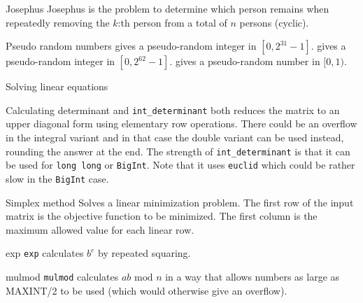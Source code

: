 \begin{algorithm}{Josephus}
\desc
Josephus is the problem to determine which person remains when repeatedly
removing the $k$:th person from a total of $n$ persons (cyclic).
\end{algorithm}


\begin{algorithm}{Pseudo random numbers}
 gives a pseudo-random integer in
$[0,2^{31}-1]$.
 gives a pseudo-random integer in
$[0,2^{62}-1]$.
 gives a pseudo-random number in
$[0,1)$.
\end{algorithm}

\begin{algorithm}{Solving linear equations}
\end{algorithm}

\begin{algorithm}{Calculating determinant}
 and {\tt int\_determinant} both reduces the matrix
to an upper diagonal form using elementary row operations. There could be an
overflow in the integral variant and in that case the double variant
can be used instead, rounding the answer at the end. The strength of
{\tt int\_determinant} is that it can be used for {\tt long long} or
{\tt BigInt}. Note that it uses {\tt euclid} which could be rather
slow in the {\tt BigInt} case.
\end{algorithm}

\begin{algorithm}{Simplex method}
\desc
Solves a linear minimization problem. The first row of the
input matrix is the objective function to be minimized. The
first column is the maximum allowed value for each linear row.
\end{algorithm}

\begin{algorithm}{exp}
\desc
{\tt exp} calculates $b^e$ by repeated squaring.
\end{algorithm}

\begin{algorithm}{mulmod}
\desc
{\tt mulmod} calculates $ab\mbox{ mod } n$ in a way that
allows numbers as large as MAXINT/2 to be used (which would otherwise give
an overflow).
\end{algorithm}


